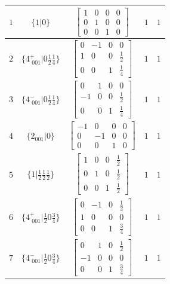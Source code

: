 \documentclass[fleqn,8pt]{jsarticle}
\begin{document}
\begin{longtable}{ccccc}
$ 1 $ & $ \{1|0\} $ & $ \begin{bmatrix} 1 & 0 & 0 & 0 \\ 0 & 1 & 0 & 0 \\ 0 & 0 & 1 & 0 \end{bmatrix} $ & $ 1 $ & $ 1 $ \\ \hline
$ 2 $ & $ \{4^{+}_{\,\,001}|0 \frac{1}{2} \frac{1}{4}\} $ & $ \begin{bmatrix} 0 & -1 & 0 & 0 \\ 1 & 0 & 0 & \frac{1}{2} \\ 0 & 0 & 1 & \frac{1}{4} \end{bmatrix} $ & $ 1 $ & $ 1 $ \\ \hline
$ 3 $ & $ \{4^{-}_{\,\,001}|0 \frac{1}{2} \frac{1}{4}\} $ & $ \begin{bmatrix} 0 & 1 & 0 & 0 \\ -1 & 0 & 0 & \frac{1}{2} \\ 0 & 0 & 1 & \frac{1}{4} \end{bmatrix} $ & $ 1 $ & $ 1 $ \\ \hline
$ 4 $ & $ \{2{}_{001}|0\} $ & $ \begin{bmatrix} -1 & 0 & 0 & 0 \\ 0 & -1 & 0 & 0 \\ 0 & 0 & 1 & 0 \end{bmatrix} $ & $ 1 $ & $ 1 $ \\ \hline
$ 5 $ & $ \{1|\frac{1}{2} \frac{1}{2} \frac{1}{2}\} $ & $ \begin{bmatrix} 1 & 0 & 0 & \frac{1}{2} \\ 0 & 1 & 0 & \frac{1}{2} \\ 0 & 0 & 1 & \frac{1}{2} \end{bmatrix} $ & $ 1 $ & $ 1 $ \\ \hline
$ 6 $ & $ \{4^{+}_{\,\,001}|\frac{1}{2} 0 \frac{3}{4}\} $ & $ \begin{bmatrix} 0 & -1 & 0 & \frac{1}{2} \\ 1 & 0 & 0 & 0 \\ 0 & 0 & 1 & \frac{3}{4} \end{bmatrix} $ & $ 1 $ & $ 1 $ \\ \hline
$ 7 $ & $ \{4^{-}_{\,\,001}|\frac{1}{2} 0 \frac{3}{4}\} $ & $ \begin{bmatrix} 0 & 1 & 0 & \frac{1}{2} \\ -1 & 0 & 0 & 0 \\ 0 & 0 & 1 & \frac{3}{4} \end{bmatrix} $ & $ 1 $ & $ 1 $ \\ \hline

\end{longtable}
\end{document}
